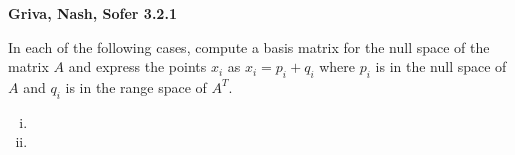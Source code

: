 \textbf{Griva, Nash, Sofer 3.2.1}

In each of the following cases, compute a basis matrix for the null space of the matrix $A$ and express the points $x_i$
as $x_i = p_i + q_i$ where $p_i$ is in the null space of $A$ and $q_i$ is in the range space of $A^T$.

\begin{enumerate}[(i)]
    \item 
    \pagebreak
    \item 
\end{enumerate}
